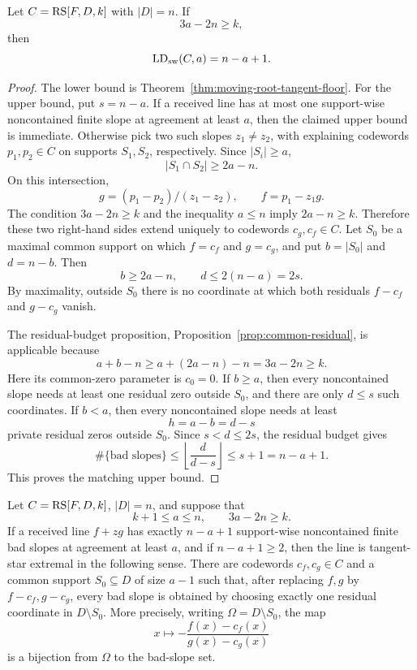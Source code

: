 \begin{theorem}
\label{thm:very-high-tangent-staircase}
Let \(C=\operatorname{RS}[F,D,k]\) with \(|D|=n\).  If
\[
  3a-2n\ge k,
\]
then
\[
  \operatorname{LD}_{\rm sw}(C,a)=n-a+1 .
\]
\end{theorem}

\begin{proof}
The lower bound is Theorem~\ref{thm:moving-root-tangent-floor}.  For the upper
bound, put \(s=n-a\).  If a received line has at most one support-wise
noncontained finite slope at agreement at least \(a\), then the claimed upper
bound is immediate.  Otherwise pick two such slopes \(z_1\ne z_2\), with
explaining codewords \(p_1,p_2\in C\) on supports \(S_1,S_2\), respectively.
Since \(|S_i|\ge a\),
\[
  |S_1\cap S_2|\ge 2a-n.
\]
On this intersection,
\[
  g=(p_1-p_2)/(z_1-z_2),
  \qquad
  f=p_1-z_1g .
\]
The condition \(3a-2n\ge k\) and the inequality \(a\le n\) imply
\(2a-n\ge k\).  Therefore these two right-hand sides extend uniquely to
codewords \(c_g,c_f\in C\).  Let \(S_0\) be a maximal common support on which
\(f=c_f\) and \(g=c_g\), and put \(b=|S_0|\) and \(d=n-b\).  Then
\[
  b\ge2a-n,\qquad d\le2(n-a)=2s .
\]
By maximality, outside \(S_0\) there is no coordinate at which both residuals
\(f-c_f\) and \(g-c_g\) vanish.

The residual-budget proposition, Proposition~\ref{prop:common-residual}, is
applicable because
\[
  a+b-n\ge a+(2a-n)-n=3a-2n\ge k .
\]
Here its common-zero parameter is \(c_0=0\).  If \(b\ge a\), then every
noncontained slope needs at least one residual zero outside \(S_0\), and there
are only \(d\le s\) such coordinates.  If \(b<a\), then every noncontained
slope needs at least
\[
  h=a-b=d-s
\]
private residual zeros outside \(S_0\).  Since \(s<d\le2s\), the residual
budget gives
\[
  \#\{\text{bad slopes}\}
  \le
  \left\lfloor \frac d{d-s}\right\rfloor
  \le s+1
  =n-a+1 .
\]
This proves the matching upper bound.
\end{proof}

\begin{corollary}
\label{cor:tangent-star-extremizers}
Let \(C=\operatorname{RS}[F,D,k]\), \(|D|=n\), and suppose that
\[
  k+1\le a\le n,
  \qquad
  3a-2n\ge k.
\]
If a received line \(f+zg\) has exactly \(n-a+1\) support-wise noncontained
finite bad slopes at agreement at least \(a\), and if \(n-a+1\ge2\), then the
line is tangent-star extremal in the following sense.  There are codewords
\(c_f,c_g\in C\) and a common support \(S_0\subseteq D\) of size \(a-1\) such
that, after replacing \(f,g\) by \(f-c_f,g-c_g\), every bad slope is obtained by
choosing exactly one residual coordinate in \(D\setminus S_0\).  More precisely,
writing \(\Omega=D\setminus S_0\), the map
\[
  x\longmapsto
  -\frac{f(x)-c_f(x)}{g(x)-c_g(x)}
\]
is a bijection from \(\Omega\) to the bad-slope set.
\end{corollary}

